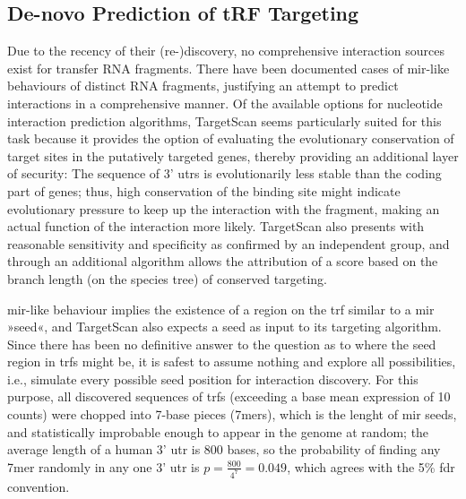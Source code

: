 \subsection{De-novo Prediction of tRF Targeting}
Due to the recency of their (re-)discovery, no comprehensive interaction sources exist for transfer RNA fragments. There have been documented cases of \ac{mir}-like behaviours of distinct RNA fragments\cite{Cole2009,Kumar2014}, justifying an attempt to predict interactions in a comprehensive manner. Of the available options for nucleotide interaction prediction algorithms, TargetScan\cite{Friedman2009} seems particularly suited for this task because it provides the option of evaluating the evolutionary conservation of target sites in the putatively targeted genes, thereby providing an additional layer of security: The sequence of 3' \acp{utr} is evolutionarily less stable than the coding part of genes; thus, high conservation of the binding site might indicate evolutionary pressure to keep up the interaction with the fragment, making an actual function of the interaction more likely. TargetScan also presents with reasonable sensitivity and specificity as confirmed by an independent group\cite{Alexiou2009}, and through an additional algorithm allows the attribution of a score based on the branch length (on the species tree) of conserved targeting\cite{Agarwal2015}.

\ac{mir}-like behaviour implies the existence of a region on the \ac{trf} similar to a \ac{mir} »seed«, and TargetScan also expects a seed as input to its targeting algorithm. Since there has been no definitive answer to the question as to where the seed region in \acp{trf} might be, it is safest to assume nothing and explore all possibilities, i.e., simulate every possible seed position for interaction discovery. For this purpose, all discovered sequences of \acp{trf} (exceeding a base mean expression of 10 counts) were chopped into 7-base pieces (7mers), which is the lenght of \ac{mir} seeds, and statistically improbable enough to appear in the genome at random; the average length of a human 3' \ac{utr} is 800 bases, so the probability of finding any 7mer randomly in any one 3' \ac{utr} is $p = \frac{800}{4^7} = 0.049$, which agrees with the 5\% \ac{fdr} convention.



